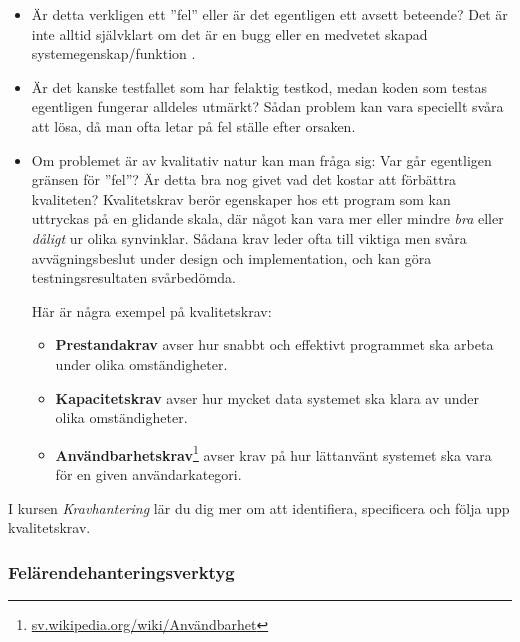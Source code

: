\begin{itemize}
\item Är detta verkligen ett ''fel'' eller är det egentligen ett avsett beteende? Det är inte alltid självklart om det är en bugg eller en medvetet skapad systemegenskap/funktion .

\item Är det kanske testfallet som har felaktig testkod, medan koden som testas egentligen fungerar alldeles utmärkt? Sådan problem kan vara speciellt svåra att lösa, då man ofta letar på fel ställe efter orsaken.

\item Om problemet är av kvalitativ natur kan man fråga sig: Var går egentligen gränsen för ''fel''? Är detta bra nog givet vad det kostar att förbättra kvaliteten? Kvalitetskrav berör egenskaper hos ett program som kan uttryckas på en glidande skala, där något kan vara mer eller mindre \emph{bra} eller \emph{dåligt} ur olika synvinklar. Sådana krav leder ofta till viktiga men svåra avvägningsbeslut under design och implementation, och kan göra testningsresultaten svårbedömda.

Här är några exempel på kvalitetskrav:
\begin{itemize}
\item \textbf{Prestandakrav}  avser hur snabbt och effektivt programmet ska arbeta under olika omständigheter.
 
\item \textbf{Kapacitetskrav}  avser hur mycket data systemet ska klara av under olika omständigheter.

\item \textbf{Användbarhetskrav}\footnote{\href{https://sv.wikipedia.org/wiki/Anv\%C3\%A4ndbarhet}{sv.wikipedia.org/wiki/Användbarhet}}  avser krav på hur lättanvänt systemet ska vara för en given användarkategori. 
\end{itemize} 

\end{itemize}

I kursen \textit{Kravhantering}  lär du dig mer om att identifiera, specificera och följa upp kvalitetskrav.

\subsubsection{Felärendehanteringsverktyg} 

